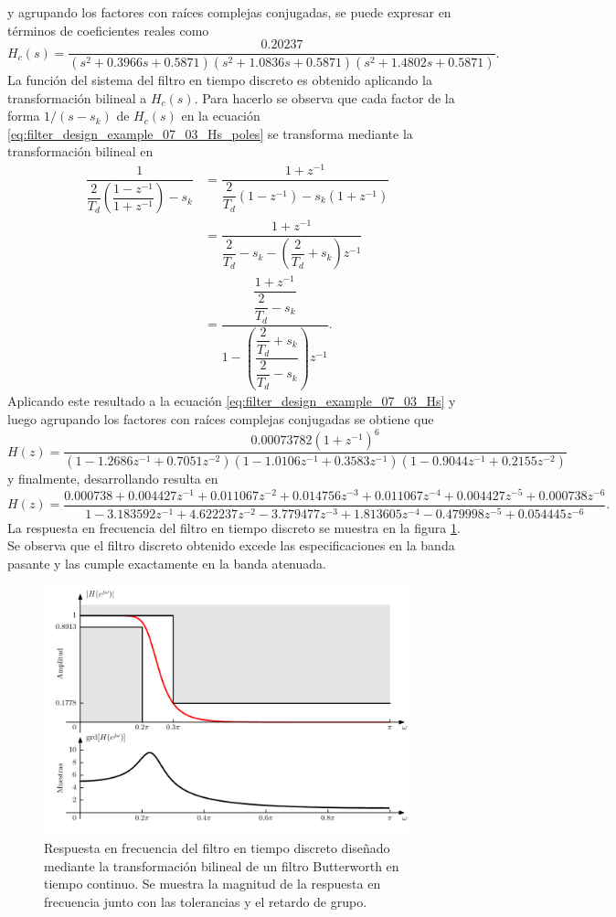 \documentclass[a4paper]{report}
\begin{document}
y agrupando los factores con raíces complejas conjugadas, se puede expresar en términos de coeficientes reales como
\[
 H_c(s)=\dfrac{0.20237}{(s^2+0.3966s+0.5871)(s^2+1.0836s+0.5871)(s^2+1.4802s+0.5871)}.
\]
La función del sistema del filtro en tiempo discreto es obtenido aplicando la transformación bilineal a \(H_c(s)\). Para hacerlo se observa que cada factor de la forma \(1/(s-s_k)\) de \(H_c(s)\) en la ecuación \ref{eq:filter_design_example_07_03_Hs_poles} se transforma mediante la transformación bilineal en
\begin{align*}
  \dfrac{1}{\dfrac{2}{T_d}\left(\dfrac{1-z^{-1}}{1+z^{-1}}\right)-s_k}
  &=\dfrac{1+z^{-1}}{\dfrac{2}{T_d}(1-z^{-1})-s_k(1+z^{-1})}\\
  &=\dfrac{1+z^{-1}}{\dfrac{2}{T_d}-s_k-\left(\dfrac{2}{T_d}+s_k\right)z^{-1}}\\
  &=\dfrac{\dfrac{1+z^{-1}}{\dfrac{2}{T_d}-s_k}}{1-\left(\dfrac{\dfrac{2}{T_d}+s_k}{\dfrac{2}{T_d}-s_k}\right)z^{-1}}.
\end{align*}
Aplicando este resultado a la ecuación \ref{eq:filter_design_example_07_03_Hs} y luego agrupando los factores con raíces complejas conjugadas se obtiene que 
\[
 H(z)=\frac{0.00073782(1+z^{-1})^6}{(1-1.2686z^{-1}+0.7051z^{-2})(1-1.0106z^{-1}+0.3583z^{-1})(1-0.9044z^{-1}+0.2155z^{-2})}
\]
y finalmente, desarrollando resulta en
{\small
\[
 H(z)=\frac{0.000738+0.004427z^{-1}+0.011067z^{-2}+0.014756z^{-3}+0.011067z^{-4}+0.004427z^{-5}+0.000738z^{-6}}{1-3.183592z^{-1}+4.622237z^{-2}-3.779477z^{-3}+1.813605z^{-4}-0.479998z^{-5}+0.054445z^{-6}}.
\]}
La respuesta en frecuencia del filtro en tiempo discreto se muestra en la figura \ref{fig:filter_design_example_07_03_freq_response}. Se observa que el filtro discreto obtenido excede las especificaciones en la banda pasante y las cumple exactamente en la banda atenuada.
\begin{figure}[!htb]
 \begin{center}
 \includegraphics[width=0.95\textwidth]{figuras/filter_design_example_07_03_freq_response.pdf}
 \caption{\label{fig:filter_design_example_07_03_freq_response} Respuesta en frecuencia del filtro en tiempo discreto diseñado mediante la transformación bilineal de un filtro Butterworth en tiempo continuo. Se muestra la magnitud de la respuesta en frecuencia junto con las tolerancias y el retardo de grupo.}
 \end{center}
\end{figure}
\end{document}
